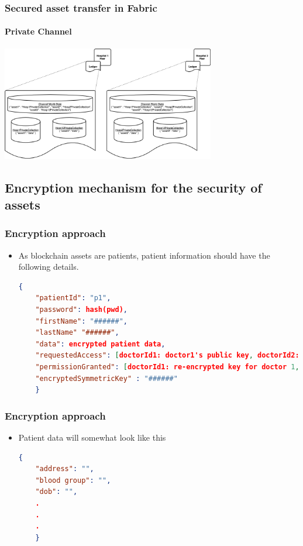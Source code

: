 \documentclass[english,hangout]{beamer}
\begin{document}
\begin{frame}[fragile]
    \frametitle{Secured asset transfer in Fabric}
    \framesubtitle{Private Channel}
    \begin{center}
        \vspace{-1.2em}
            \includegraphics[height=5cm]{PrivateChannel.png}
        \end{center}
        \vspace{-3mm}
\end{frame}


\subsection{Encryption mechanism for the security of assets}
\begin{frame}[fragile]
 \frametitle{Encryption approach}
  \begin{itemize}
  \item As blockchain assets are patients, patient information should have the following details. 
    \begin{lstlisting}[language=json,firstnumber=1]
    {
    "patientId": "p1",
    "password": hash(pwd),
    "firstName": "######",
    "lastName" "######",
    "data": encrypted patient data,
    "requestedAccess": [doctorId1: doctor1's public key, doctorId2: doctor2's public key, ...],
    "permissionGranted": [doctorId1: re-encrypted key for doctor 1, doctorId1: re-encrypted key for doctor 1, ...],
    "encryptedSymmetricKey" : "######"
    }    
    \end{lstlisting}
    \end{itemize}
\end{frame}

\begin{frame}[fragile]
 \frametitle{Encryption approach}
  \begin{itemize}
    \item Patient data will somewhat look like this
    \begin{lstlisting}[language=json,firstnumber=1]
    {
    "address": "",
    "blood group": "",
    "dob": "",
    .
    .
    .
    }
    \end{lstlisting}
  \end{itemize}
\end{frame}
\end{document}
